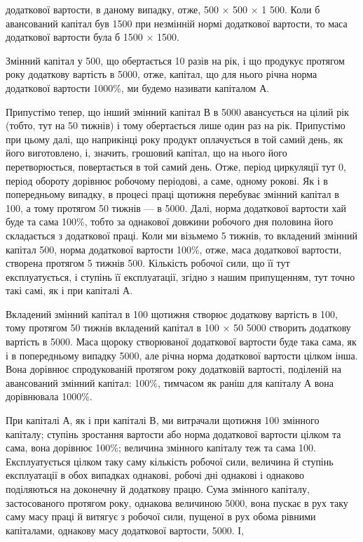 \parcont{}  %
додаткової вартости, в даному випадку, отже, 500 ×  \deq{} 500 × 1 \deq{} 500. Коли б
авансований капітал був \deq{} 1500 при незмінній
нормі додаткової вартости, то маса додаткової вартости була б \deq{}
1500 ×  \deq{} 1500.

Змінний капітал у 500, що обертається 10 разів на рік, і
що продукує протягом року додаткову вартість в 5000, отже,
капітал, що для нього річна норма додаткової вартости \deq{} 1000\%, ми
будемо називати капіталом А.

Припустімо тепер, що інший змінний капітал В в 5000
авансується на цілий рік (тобто, тут на 50 тижнів) і тому обертається
лише один раз на рік. Припустімо при цьому далі, що наприкінці року
продукт оплачується в той самий день, як його виготовлено, і, значить,
грошовий капітал, що на нього його перетворюється, повертається в той
самий день. Отже, період циркуляції тут \deq{} 0, період обороту дорівнює
робочому періодові, а саме, одному рокові. Як і в попередньому випадку,
в процесі праці щотижня перебуває змінний капітал в 100,
а тому протягом 50 тижнів — в 5000. Далі, норма додаткової
вартости хай буде та сама \deq{} 100\%, тобто за однакової довжини робочого
дня половина його складається з додаткової праці. Коли ми візьмемо
5 тижнів, то вкладений змінний капітал \deq{} 500, норма додаткової
вартости \deq{} 100\%, отже, маса додаткової вартости, створена протягом
5 тижнів \deq{} 500. Кількість робочої сили, що її тут експлуатується,
і ступінь її експлуатації, згідно з нашим припущенням, тут
точно такі самі, як і при капіталі А.

Вкладений змінний капітал в 100 щотижня створює додаткову
вартість в 100, тому протягом 50 тижнів вкладений капітал
в 100 × 50 \deq{} 5000 створить додаткову вартість в 5000. Маса щороку створюваної
додаткової вартости буде така сама, як і в попередньому випадку \deq{} 5000, але річна норма
додаткової
вартости цілком інша. Вона дорівнює спродукованій протягом року
додатковій вартості, поділеній на авансований змінний капітал:
 \deq{} 100\%, тимчасом як раніш для капіталу А вона дорівнювала 1000\%.

При капіталі А, як і при капіталі В, ми витрачали щотижня 100 змінного капіталу; ступінь
зростання вартости або норма додаткової
вартости цілком та сама, вона дорівнює 100\%; величина змінного
капіталу теж та сама \deq{} 100. Експлуатується цілком таку
саму кількість робочої сили, величина й ступінь експлуатації в обох випадках
однакові, робочі дні однакові і однаково поділяються на доконечну
й додаткову працю. Сума змінного капіталу, застосованого протягом
року, однакова величиною \deq{} 5000, вона пускає в рух таку
саму масу праці й витягує з робочої сили, пущеної в рух обома рівними
капіталами, однакову масу додаткової вартости, 5000. І,
\parbreak{}  %
